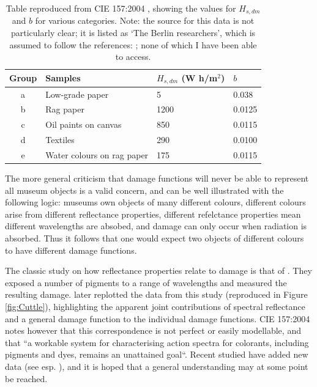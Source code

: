 \begin{table}[htbp]
\centering
\begin{tabular}{|c|l|l|l|}
\hline
Group & Samples & $H_{s,dm}$ (W h/m$^{2}$) & $b$ \\ \hline
a & Low-grade paper & 5 & 0.038 \\ \hline
b & Rag paper & 1200 & 0.0125 \\ \hline
c & Oil paints on canvas & 850 & 0.0115 \\ \hline
d & Textiles & 290 & 0.0100 \\ \hline
e & Water colours on rag paper & 175 & 0.0115 \\ \hline
\end{tabular}
\caption{Table reproduced from CIE 157:2004 \citep{cie_cie_2004}, showing the values for $H_{s,dm}$ and $b$ for various categories. Note: the source for this data is not particularly clear; it is listed as `The Berlin researchers', which is assumed to follow the references: \citet{krochmann_beleuchtung_1988,cie_cie_1991,hilbert_zur_1991}; none of which I have been able to access.}
\label{tab:b}
\end{table}

The more general criticism that damage functions will never be able to represent all museum objects is a valid concern, and can be well illustrated with the following logic: museums own objects of many different colours, different colours arise from different reflectance properties, different refelctance properties mean different wavelengths are absobed, and damage can only occur when radiation is absorbed. Thus it follows that one would expect two objects of different colours to have different damage functions. 

The classic study on how reflectance properties relate to damage is that of \citet{saunders_wavelength-dependent_1994}. They exposed a number of pigments to a range of wavelengths and measured the resulting damage. \citet{cuttle_control_1999} later replotted the data from this study (reproduced in Figure \ref{fig:Cuttle}), highlighting the apparent joint contributions of spectral reflectance and a general damage function to the individual damage functions. CIE 157:2004 notes however that this correspondence is not perfect or easily modellable, and that ``a workable system for characterising action spectra for colorants, including pigments and dyes, remains an unattained goal``. Recent studied have added new data (see esp. \citet{villmann_wavelength_2018}), and it is hoped that a general understanding may at some point be reached.

